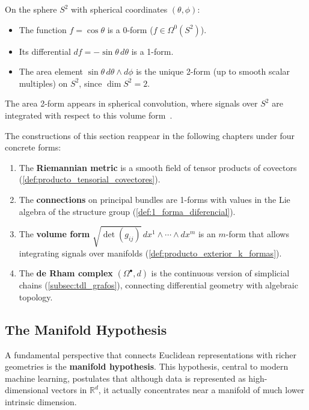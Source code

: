 \begin{example}\label{ex:formas_esfera}
On the sphere $S^2$ with spherical coordinates $(\theta, \phi)$:
\begin{itemize}
    \item The function $f = \cos\theta$ is a 0-form ($f \in \Omega^0(S^2)$).
    \item Its differential $df = -\sin\theta \, d\theta$ is a 1-form.
    \item The area element $\sin\theta \, d\theta \wedge d\phi$ is the unique 2-form (up to smooth scalar multiples) on $S^2$, since $\dim S^2 = 2$.
\end{itemize}
The area 2-form appears in spherical convolution, where signals over $S^2$ are integrated with respect to this volume form~\citep{cohen2018sphericalcnns}.
\end{example}

\begin{remark}\label{rem:formas_gdl}
The constructions of this section reappear in the following chapters under four concrete forms:
\begin{enumerate}
    \item The \textbf{Riemannian metric} is a smooth field of tensor products of covectors (\autoref{def:producto_tensorial_covectores}).
    \item The \textbf{connections} on principal bundles are 1-forms with values in the Lie algebra of the structure group (\autoref{def:1_forma_diferencial}).
    \item The \textbf{volume form} $\sqrt{\det(g_{ij})} \, dx^1 \wedge \cdots \wedge dx^m$ is an $m$-form that allows integrating signals over manifolds (\autoref{def:producto_exterior_k_formas}).
    \item The \textbf{de Rham complex} $(\Omega^\bullet, d)$ is the continuous version of simplicial chains (\autoref{subsec:tdl_grafos}), connecting differential geometry with algebraic topology.
\end{enumerate}
\end{remark}

\subsection{The Manifold Hypothesis}\label{subsec:hipotesis_variedad}

A fundamental perspective that connects Euclidean representations with richer geometries is the \textbf{manifold hypothesis}. This hypothesis, central to modern machine learning, postulates that although data is represented as high-dimensional vectors in $\mathbb{R}^d$, it actually concentrates near a manifold of much lower intrinsic dimension.

